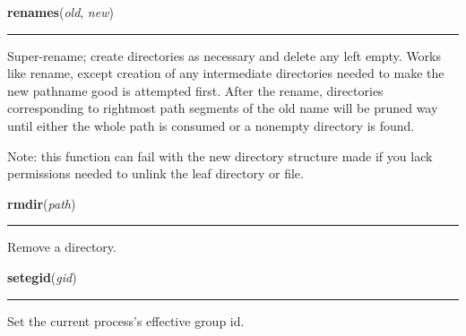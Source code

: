     \label{os:renames}

    \vspace{0.5ex}

\hspace{.8\funcindent}\begin{boxedminipage}{\funcwidth}

    \raggedright \textbf{renames}(\textit{old}, \textit{new})

    \vspace{-1.5ex}

    \rule{\textwidth}{0.5\fboxrule}
\setlength{\parskip}{2ex}
    Super-rename; create directories as necessary and delete any left 
    empty.  Works like rename, except creation of any intermediate 
    directories needed to make the new pathname good is attempted first.  
    After the rename, directories corresponding to rightmost path segments 
    of the old name will be pruned way until either the whole path is 
    consumed or a nonempty directory is found.

    Note: this function can fail with the new directory structure made if 
    you lack permissions needed to unlink the leaf directory or file.

\setlength{\parskip}{1ex}
    \end{boxedminipage}

    \label{os:rmdir}

    \vspace{0.5ex}

\hspace{.8\funcindent}\begin{boxedminipage}{\funcwidth}

    \raggedright \textbf{rmdir}(\textit{path})

    \vspace{-1.5ex}

    \rule{\textwidth}{0.5\fboxrule}
\setlength{\parskip}{2ex}
    Remove a directory.

\setlength{\parskip}{1ex}
    \end{boxedminipage}

    \label{os:setegid}

    \vspace{0.5ex}

\hspace{.8\funcindent}\begin{boxedminipage}{\funcwidth}

    \raggedright \textbf{setegid}(\textit{gid})

    \vspace{-1.5ex}

    \rule{\textwidth}{0.5\fboxrule}
\setlength{\parskip}{2ex}
    Set the current process's effective group id.

\setlength{\parskip}{1ex}
    \end{boxedminipage}

